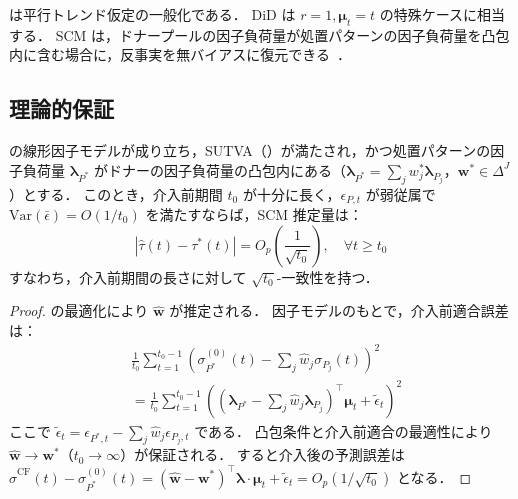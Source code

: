 \begin{remark}
 は平行トレンド仮定の一般化である．
DiD は $r=1, \boldsymbol{\mu}_t = t$ の特殊ケースに相当する．
SCM は，ドナープールの因子負荷量が処置パターンの因子負荷量を凸包内に含む場合に，反事実を無バイアスに復元できる~\cite{abadie2010synthetic}．
\end{remark}

\subsection{理論的保証}

\begin{theorem}[因子モデル下での一致性]
\label{thm:unbiased}
 の線形因子モデルが成り立ち，SUTVA（）が満たされ，かつ処置パターンの因子負荷量 $\boldsymbol{\lambda}_{P^*}$ がドナーの因子負荷量の凸包内にある（$\boldsymbol{\lambda}_{P^*} = \sum_j w_j^* \boldsymbol{\lambda}_{P_j}$，$\mathbf{w}^* \in \Delta^J$）とする．
このとき，介入前期間 $t_0$ が十分に長く，$\epsilon_{P,t}$ が弱従属で $\mathrm{Var}(\bar{\epsilon}) = O(1/t_0)$ を満たすならば，SCM 推定量は：
\begin{equation}
    |\hat{\tau}(t) - \tau^*(t)| = O_p\left(\frac{1}{\sqrt{t_0}}\right), \quad \forall t \geq t_0
\end{equation}
すなわち，介入前期間の長さに対して $\sqrt{t_0}$-一致性を持つ．
\end{theorem}

\begin{proof}
 の最適化により $\hat{\mathbf{w}}$ が推定される．
因子モデルのもとで，介入前適合誤差は：
\begin{align}
    &\frac{1}{t_0}\sum_{t=1}^{t_0-1}\left(\sigma_{P^*}^{(0)}(t) - \sum_j \hat{w}_j \sigma_{P_j}(t)\right)^2 \\
    &= \frac{1}{t_0}\sum_{t=1}^{t_0-1}\left((\boldsymbol{\lambda}_{P^*} - \sum_j \hat{w}_j \boldsymbol{\lambda}_{P_j})^\top \boldsymbol{\mu}_t + \tilde{\epsilon}_t\right)^2
\end{align}
ここで $\tilde{\epsilon}_t = \epsilon_{P^*,t} - \sum_j \hat{w}_j \epsilon_{P_j,t}$ である．
凸包条件と介入前適合の最適性により $\hat{\mathbf{w}} \to \mathbf{w}^*$（$t_0 \to \infty$）が保証される．
すると介入後の予測誤差は $\hat{\sigma}^{\mathrm{CF}}(t) - \sigma_{P^*}^{(0)}(t) = (\hat{\mathbf{w}} - \mathbf{w}^*)^\top \boldsymbol{\lambda} \cdot \boldsymbol{\mu}_t + \tilde{\epsilon}_t = O_p(1/\sqrt{t_0})$ となる．
\end{proof}

